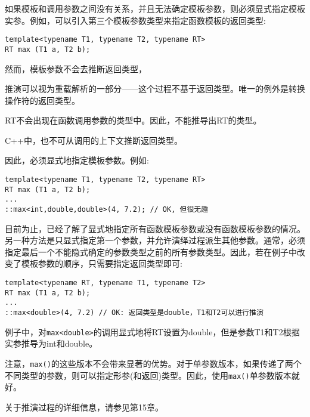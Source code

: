 如果模板和调用参数之间没有关系，并且无法确定模板参数，则必须显式指定模板实参。例如，可以引入第三个模板参数类型来指定函数模板的返回类型:

\begin{lstlisting}[style=styleCXX]
template<typename T1, typename T2, typename RT>
RT max (T1 a, T2 b);
\end{lstlisting}

然而，模板参数不会去推断返回类型，

\begin{tcolorbox}[colback=webgreen!5!white,colframe=webgreen!75!black]
\hspace*{0.75cm}推演可以视为重载解析的一部分——这个过程不基于返回类型。唯一的例外是转换操作符的返回类型。
\end{tcolorbox}

RT不会出现在函数调用参数的类型中。因此，不能推导出RT的类型。

\begin{tcolorbox}[colback=webgreen!5!white,colframe=webgreen!75!black]
\hspace*{0.75cm}C++中，也不可从调用的上下文推断返回类型。
\end{tcolorbox}

因此，必须显式地指定模板参数。例如:

\begin{lstlisting}[style=styleCXX]
template<typename T1, typename T2, typename RT>
RT max (T1 a, T2 b);
...
::max<int,double,double>(4, 7.2); // OK, 但很无趣
\end{lstlisting}

目前为止，已经了解了显式地指定所有函数模板参数或没有函数模板参数的情况。另一种方法是只显式指定第一个参数，并允许演绎过程派生其他参数。通常，必须指定最后一个不能隐式确定的参数类型之前的所有参数类型。因此，若在例子中改变了模板参数的顺序，只需要指定返回类型即可:

\begin{lstlisting}[style=styleCXX]
template<typename RT, typename T1, typename T2>
RT max (T1 a, T2 b);
...
::max<double>(4, 7.2) // OK: 返回类型是double，T1和T2可以进行推演
\end{lstlisting}

例子中，对\texttt{max<double>}的调用显式地将RT设置为double，但是参数T1和T2根据实参推导为int和double。

注意，\texttt{max()}的这些版本不会带来显著的优势。对于单参数版本，如果传递了两个不同类型的参数，则可以指定形参(和返回)类型。因此，使用\texttt{max()}单参数版本就好。

关于推演过程的详细信息，请参见第15章。

